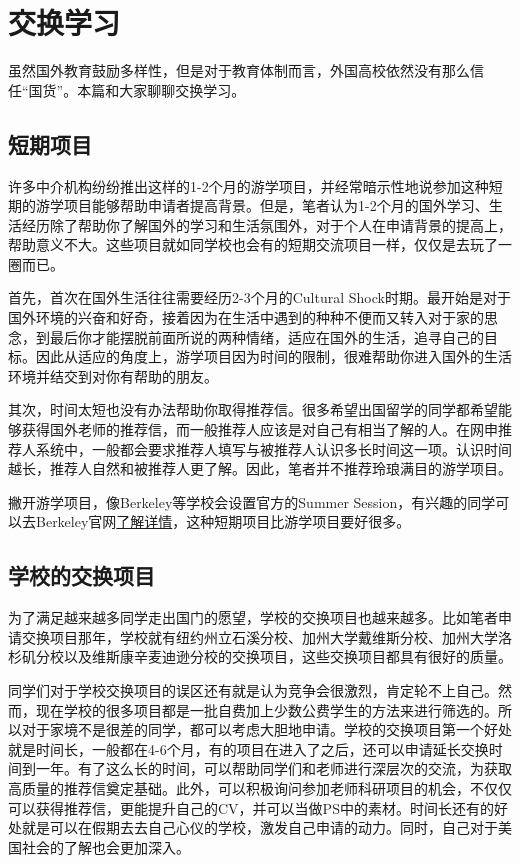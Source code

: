 \section{交换学习}
虽然国外教育鼓励多样性，但是对于教育体制而言，外国高校依然没有那么信任“国货”。本篇和大家聊聊交换学习。
\subsection{短期项目}
许多中介机构纷纷推出这样的1-2个月的游学项目，并经常暗示性地说参加这种短期的游学项目能够帮助申请者提高背景。但是，笔者认为1-2个月的国外学习、生活经历除了帮助你了解国外的学习和生活氛围外，对于个人在申请背景的提高上，帮助意义不大。这些项目就如同学校也会有的短期交流项目一样，仅仅是去玩了一圈而已。\par
首先，首次在国外生活往往需要经历2-3个月的Cultural Shock时期。最开始是对于国外环境的兴奋和好奇，接着因为在生活中遇到的种种不便而又转入对于家的思念，到最后你才能摆脱前面所说的两种情绪，适应在国外的生活，追寻自己的目标。因此从适应的角度上，游学项目因为时间的限制，很难帮助你进入国外的生活环境并结交到对你有帮助的朋友。\par
其次，时间太短也没有办法帮助你取得推荐信。很多希望出国留学的同学都希望能够获得国外老师的推荐信，而一般推荐人应该是对自己有相当了解的人。在网申推荐人系统中，一般都会要求推荐人填写与被推荐人认识多长时间这一项。认识时间越长，推荐人自然和被推荐人更了解。因此，笔者并不推荐玲琅满目的游学项目。\par
撇开游学项目，像Berkeley等学校会设置官方的Summer Session，有兴趣的同学可以去Berkeley官网\href{http://summer.berkeley.edu/}{了解详情}，这种短期项目比游学项目要好很多。
\subsection{学校的交换项目}
为了满足越来越多同学走出国门的愿望，学校的交换项目也越来越多。比如笔者申请交换项目那年，学校就有纽约州立石溪分校、加州大学戴维斯分校、加州大学洛杉矶分校以及维斯康辛麦迪逊分校的交换项目，这些交换项目都具有很好的质量。\par
同学们对于学校交换项目的误区还有就是认为竞争会很激烈，肯定轮不上自己。然而，现在学校的很多项目都是一批自费加上少数公费学生的方法来进行筛选的。所以对于家境不是很差的同学，都可以考虑大胆地申请。学校的交换项目第一个好处就是时间长，一般都在4-6个月，有的项目在进入了之后，还可以申请延长交换时间到一年。有了这么长的时间，可以帮助同学们和老师进行深层次的交流，为获取高质量的推荐信奠定基础。此外，可以积极询问参加老师科研项目的机会，不仅仅可以获得推荐信，更能提升自己的CV，并可以当做PS中的素材。时间长还有的好处就是可以在假期去去自己心仪的学校，激发自己申请的动力。同时，自己对于美国社会的了解也会更加深入。\par
